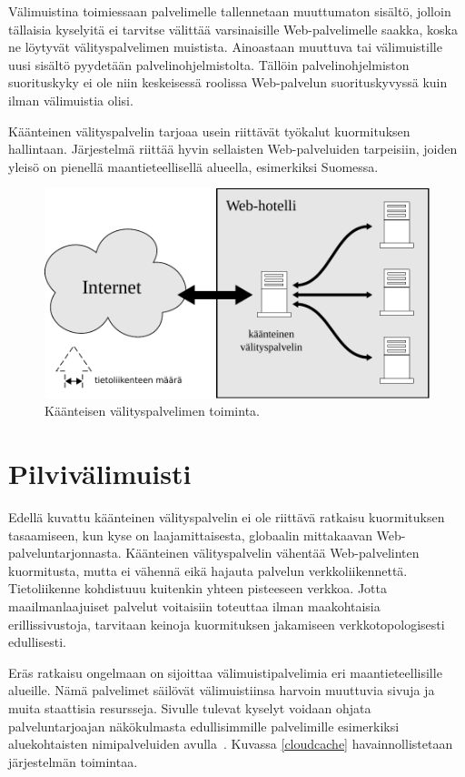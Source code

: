 Välimuistina toimiessaan palvelimelle tallennetaan muuttumaton
sisältö, jolloin tällaisia kyselyitä ei tarvitse välittää
varsinaisille Web-palvelimelle saakka, koska ne löytyvät
välityspalvelimen muistista. Ainoastaan muuttuva tai välimuistille
uusi sisältö pyydetään palvelinohjelmistolta. Tällöin
palvelinohjelmiston suorituskyky ei ole niin keskeisessä roolissa
Web-palvelun suorituskyvyssä kuin ilman välimuistia olisi.

Käänteinen välityspalvelin tarjoaa usein riittävät työkalut kuormituksen
hallintaan. Järjestelmä riittää hyvin sellaisten Web-palveluiden
tarpeisiin, joiden yleisö on pienellä maantieteellisellä alueella,
esimerkiksi Suomessa.


\begin{figure}[htp]
\centering
\includegraphics[width=12cm]{pics/reverseproxy.pdf}
\caption{Käänteisen välityspalvelimen toiminta.}
\label{reverseproxy}
\end{figure}

\section{Pilvivälimuisti}

Edellä kuvattu käänteinen välityspalvelin ei ole riittävä ratkaisu
kuormituksen tasaamiseen, kun kyse on laajamittaisesta, globaalin
mittakaavan Web-pal\-ve\-lun\-tar\-jon\-nas\-ta. Käänteinen välityspalvelin
vähentää Web-palvelinten kuormitusta, mutta ei vähennä eikä hajauta
palvelun verkkoliikennettä. Tietoliikenne kohdistuuu kuitenkin yhteen
pisteeseen verkkoa. Jotta maailmanlaajuiset palvelut voitaisiin
toteuttaa ilman maakohtaisia erillissivustoja, tarvitaan keinoja
kuormituksen jakamiseen verkkotopologisesti edullisesti.

Eräs ratkaisu ongelmaan on sijoittaa välimuistipalvelimia eri
maantieteellisille alueille. Nämä palvelimet säilövät välimuistiinsa
harvoin muuttuvia sivuja ja muita staattisia resursseja. Sivulle
tulevat kyselyt voidaan ohjata palveluntarjoajan näkökulmasta
edullisimmille palvelimille esimerkiksi aluekohtaisten nimipalveluiden
avulla~\cite{geodns}. Kuvassa \ref{cloudcache} havainnollistetaan
järjestelmän toimintaa.

